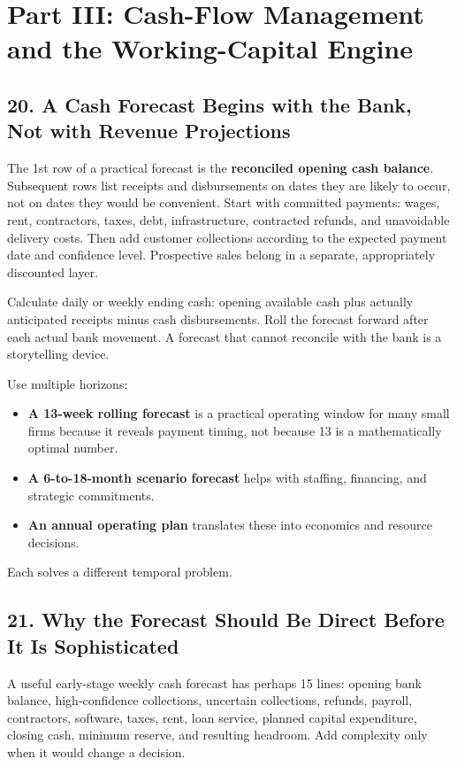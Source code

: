 \section*{Part III: Cash-Flow Management and the Working-Capital Engine}

\subsection*{20. A Cash Forecast Begins with the Bank, Not with Revenue Projections}

The 1st row of a practical forecast is the \textbf{reconciled opening cash balance}. Subsequent rows list receipts and disbursements on dates they are likely to occur, not on dates they would be convenient. Start with committed payments: wages, rent, contractors, taxes, debt, infrastructure, contracted refunds, and unavoidable delivery costs. Then add customer collections according to the expected payment date and confidence level. Prospective sales belong in a separate, appropriately discounted layer.

Calculate daily or weekly ending cash: opening available cash plus actually anticipated receipts minus cash disbursements. Roll the forecast forward after each actual bank movement. A forecast that cannot reconcile with the bank is a storytelling device.

Use multiple horizons:
\begin{itemize}
\item \textbf{A 13-week rolling forecast} is a practical operating window for many small firms because it reveals payment timing, not because 13 is a mathematically optimal number.
\item \textbf{A 6-to-18-month scenario forecast} helps with staffing, financing, and strategic commitments.
\item \textbf{An annual operating plan} translates these into economics and resource decisions.
\end{itemize}
Each solves a different temporal problem.

\subsection*{21. Why the Forecast Should Be Direct Before It Is Sophisticated}

A useful early-stage weekly cash forecast has perhaps 15 lines: opening bank balance, high-confidence collections, uncertain collections, refunds, payroll, contractors, software, taxes, rent, loan service, planned capital expenditure, closing cash, minimum reserve, and resulting headroom. Add complexity only when it would change a decision.


